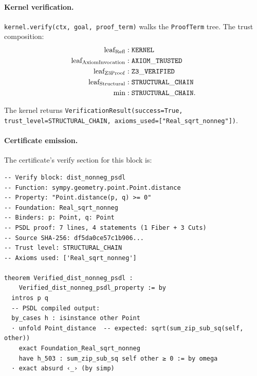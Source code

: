 \paragraph{Kernel verification.}
\texttt{kernel.verify(ctx, goal, proof\_term)} walks the
\texttt{ProofTerm} tree.  The trust composition:
\begin{align*}
  \text{leaf}_{\mathrm{Refl}}                  &: \mathtt{KERNEL}\\
  \text{leaf}_{\mathrm{AxiomInvocation}}               &: \mathtt{AXIOM\_TRUSTED}\\
  \text{leaf}_{\mathrm{Z3Proof}}                  &: \mathtt{Z3\_VERIFIED}\\
  \text{leaf}_{\mathrm{Structural}}                &: \mathtt{STRUCTURAL\_CHAIN}\\
  \min                                  &: \mathtt{STRUCTURAL\_CHAIN}.
\end{align*}

The kernel returns
\texttt{VerificationResult(success=True,
trust\_level=STRUCTURAL\_CHAIN, axioms\_used=["Real\_sqrt\_nonneg"])}.

\paragraph{Certificate emission.}
The certificate's verify section for this block is:
\begin{lstlisting}[language=lean4]
-- Verify block: dist_nonneg_psdl
-- Function: sympy.geometry.point.Point.distance
-- Property: "Point.distance(p, q) >= 0"
-- Foundation: Real_sqrt_nonneg
-- Binders: p: Point, q: Point
-- PSDL proof: 7 lines, 4 statements (1 Fiber + 3 Cuts)
-- Source SHA-256: df5da0ce57c1b906...
-- Trust level: STRUCTURAL_CHAIN
-- Axioms used: ['Real_sqrt_nonneg']

theorem Verified_dist_nonneg_psdl :
    Verified_dist_nonneg_psdl_property := by
  intros p q
  -- PSDL compiled output:
  by_cases h : isinstance other Point
  · unfold Point_distance  -- expected: sqrt(sum_zip_sub_sq(self, other))
    exact Foundation_Real_sqrt_nonneg
    have h_503 : sum_zip_sub_sq self other ≥ 0 := by omega
  · exact absurd ‹_› (by simp)
\end{lstlisting}

